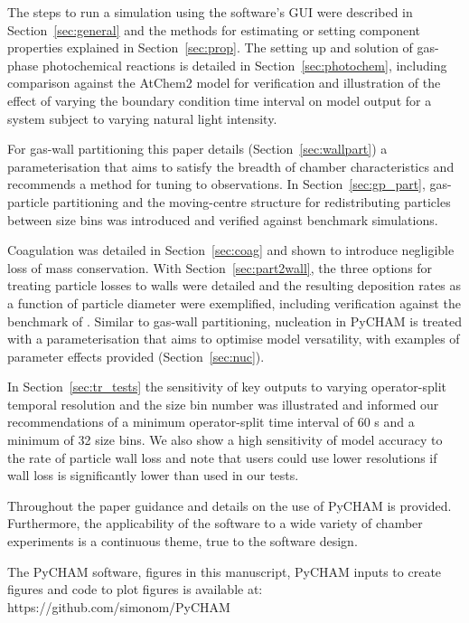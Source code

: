 \documentclass[gmd, manuscript]{copernicus}
\begin{document}
The steps to run a simulation using the software's GUI were described in Section~\ref{sec:general} and the methods for estimating or setting component properties explained in Section~\ref{sec:prop}.  The setting up and solution of gas-phase photochemical reactions is detailed in Section~\ref{sec:photochem}, including comparison against the AtChem2 model \citep{sommariva_acm2018} for verification and illustration of the effect of varying the boundary condition time interval on model output for a system subject to varying natural light intensity.

For gas-wall partitioning this paper details (Section~\ref{sec:wallpart}) a parameterisation that aims to satisfy the breadth of chamber characteristics and recommends a method for tuning to observations.  In Section~\ref{sec:gp_part}, gas-particle partitioning and the moving-centre structure for redistributing particles between size bins was introduced and verified against benchmark simulations.

Coagulation was detailed in Section~\ref{sec:coag} and shown to introduce negligible loss of mass conservation.  With Section~\ref{sec:part2wall}, the three options for treating particle losses to walls were detailed and the resulting deposition rates as a function of particle diameter were exemplified, including verification against the benchmark of \citet{McMurry1985}.  Similar to gas-wall partitioning, nucleation in PyCHAM is treated with a parameterisation that aims to optimise model versatility, with examples of parameter effects provided (Section~\ref{sec:nuc}).

In Section~\ref{sec:tr_tests} the sensitivity of key outputs to varying operator-split temporal resolution and the size bin number was illustrated and informed our recommendations of a minimum operator-split time interval of 60 s and a minimum of 32 size bins.  We also show a high sensitivity of model accuracy to the rate of particle wall loss and note that users could use lower resolutions if wall loss is significantly lower than used in our tests.

Throughout the paper guidance and details on the use of PyCHAM is provided.  Furthermore, the applicability of the software to a wide variety of chamber experiments is a continuous theme, true to the software design.



\codedataavailability %

 The PyCHAM software, figures in this manuscript, PyCHAM inputs to create figures and code to plot figures is available at: https://github.com/simonom/PyCHAM
\end{document}
